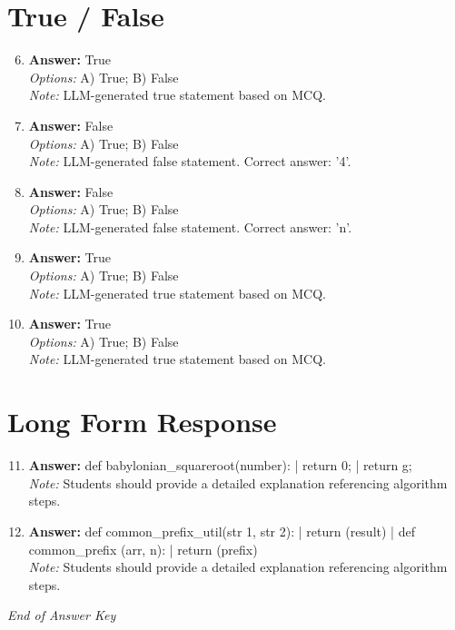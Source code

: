 \documentclass[12pt]{article}
\begin{document}
\section*{True / False}
\begin{enumerate}[label=\arabic*.]
\setcounter{enumi}{5}
\item \textbf{Answer:} True
\\ \textit{Options:} A) True; B) False
\\ \textit{Note:} LLM-generated true statement based on MCQ.
\item \textbf{Answer:} False
\\ \textit{Options:} A) True; B) False
\\ \textit{Note:} LLM-generated false statement. Correct answer: '4'.
\item \textbf{Answer:} False
\\ \textit{Options:} A) True; B) False
\\ \textit{Note:} LLM-generated false statement. Correct answer: 'n'.
\item \textbf{Answer:} True
\\ \textit{Options:} A) True; B) False
\\ \textit{Note:} LLM-generated true statement based on MCQ.
\item \textbf{Answer:} True
\\ \textit{Options:} A) True; B) False
\\ \textit{Note:} LLM-generated true statement based on MCQ.
\end{enumerate}

\section*{Long Form Response}
\begin{enumerate}[label=\arabic*.]
\setcounter{enumi}{10}
\item \textbf{Answer:} def babylonian\_squareroot(number): | return 0; | return g;
\\ \textit{Note:} Students should provide a detailed explanation referencing algorithm steps.
\item \textbf{Answer:} def common\_prefix\_util(str 1, str 2): | return (result) | def common\_prefix (arr, n): | return (prefix)
\\ \textit{Note:} Students should provide a detailed explanation referencing algorithm steps.
\end{enumerate}

\vfill
\noindent\textit{End of Answer Key}
\end{document}
